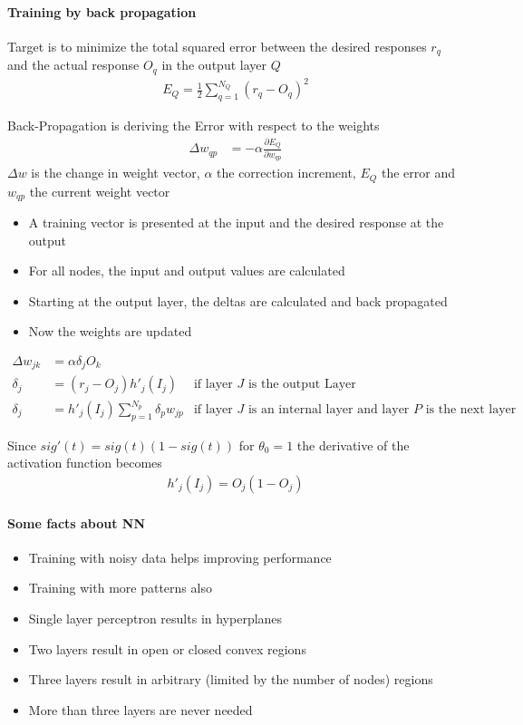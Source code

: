 \paragraph{Training by back propagation}
Target is to minimize the total squared error between the desired responses
$r_q$ and the actual response $O_q$ in the output layer $Q$
\begin{align*}
	E_Q = \frac{1}{2} \sum_{q=1}^{N_Q}(r_q-O_q)^2
\end{align*}

Back-Propagation is deriving the Error with respect to the weights
\begin{align*}
	\Delta w_{qp} &= -\alpha \frac{\partial E_Q}{\partial w_{qp}}
\end{align*}
$\Delta w$ is the change in weight vector, $\alpha$ the correction increment,
$E_Q$ the error and $w_{qp}$ the current weight vector

\begin{itemize}
\item A training vector is presented at
the input and the desired response
at the output
\item For all nodes, the input and output values are calculated
\item Starting at the output layer, the
deltas are calculated and back
propagated
\item Now the weights are updated
\end{itemize}


\begin{align*}
\Delta w_{jk} &= \alpha \delta_j O_k& \\
\delta_j &= (r_j-O_j) h'_j(I_j) & \text{if layer $J$ is the output Layer} \\
\delta_j &= h'_j(I_j) \sum_{p=1}^{N_p}\delta_p w_{jp} & \text{if layer $J$ is an internal layer and layer $P$ is the next layer}
\end{align*}

Since $sig'(t) = sig(t)(1-sig(t))$ for $\theta_0=1$ the derivative of the activation function becomes
\begin{align*}
h'_j(I_j) = O_j(1-O_j)
\end{align*}

\paragraph{Some facts about NN}
\begin{itemize}
\item Training with noisy data helps improving performance
\item Training with more patterns also
\item Single layer perceptron results in hyperplanes
\item Two layers result in open or closed convex regions
\item Three layers result in arbitrary (limited by the number of nodes) regions
\item More than three layers are never needed
\end{itemize}

